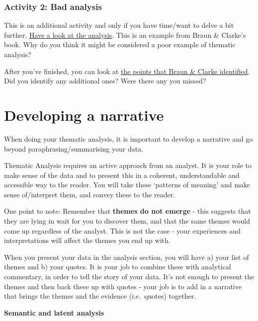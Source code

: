 \documentclass[
  english,
  letterpaper,
  DIV=11,
  numbers=noendperiod]{scrreprt}
\begin{document}
\subsubsection{Activity 2: Bad analysis}\label{activity-2-bad-analysis}

This is an additional activity and only if you have time/want to delve a
bit further.
\href{https://gla-my.sharepoint.com/:w:/g/personal/ashley_robertson_glasgow_ac_uk/EXFrzL2zbfBCjDUeP6Py3MUB3p_WS15GyVYXur83wjuYUQ?e=fTMITU}{Have
a look at the analysis}. This is an example from Braun \& Clarke's book.
Why do you think it might be considered a poor example of thematic
analysis?

After you've finished, you can look at
\href{https://gla-my.sharepoint.com/:w:/g/personal/ashley_robertson_glasgow_ac_uk/Eded8-fYVWpOrj5vFY92gyQB0ieRX7BGUhZztrdA5auVhw?e=Pysxhy}{the
points that Braun \& Clarke identified}. Did you identify any additional
ones? Were there any you missed?

\section{Developing a narrative}\label{developing-a-narrative}

When doing your thematic analysis, it is important to develop a
narrative and go beyond paraphrasing/summarising your data.

Thematic Analysis requires an active approach from an analyst. It is
your role to make sense of the data and to present this in a coherent,
understandable and accessible way to the reader. You will take these
`patterns of meaning' and make sense of/interpret them, and convey these
to the reader.

One point to note: Remember that \textbf{themes do not emerge} - this
suggests that they are lying in wait for you to discover them, and that
the same themes would come up regardless of the analyst. This is not the
case - your experiences and interpretations will affect the themes you
end up with.

When you present your data in the analysis section, you will have a)
your list of themes and b) your quotes. It is your job to combine these
with analytical commentary, in order to tell the story of your data.
It's not enough to present the themes and then back these up with quotes
- your job is to add in a narrative that brings the themes and the
evidence (i.e.~quotes) together.

\textbf{Semantic and latent analysis}
\end{document}
